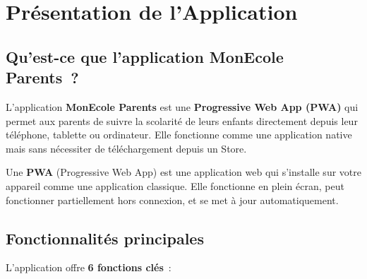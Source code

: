 \documentclass[12pt,a4paper]{report}
\begin{document}
\tableofcontents
\newpage

\chapter{Pr\'esentation de l'Application}

\section{Qu'est-ce que l'application MonEcole Parents~?}

L'application \textbf{MonEcole Parents} est une \textbf{Progressive Web App (PWA)} qui permet aux parents de suivre la scolarit\'e de leurs enfants directement depuis leur t\'el\'ephone, tablette ou ordinateur. Elle fonctionne comme une application native mais sans n\'ecessiter de t\'el\'echargement depuis un Store.

\begin{info}
Une \textbf{PWA} (Progressive Web App) est une application web qui s'installe sur votre appareil comme une application classique. Elle fonctionne en plein \'ecran, peut fonctionner partiellement hors connexion, et se met \`a jour automatiquement.
\end{info}

\section{Fonctionnalit\'es principales}

L'application offre \textbf{6 fonctions cl\'es}~:

\begin{center}
\end{center}
\end{document}
